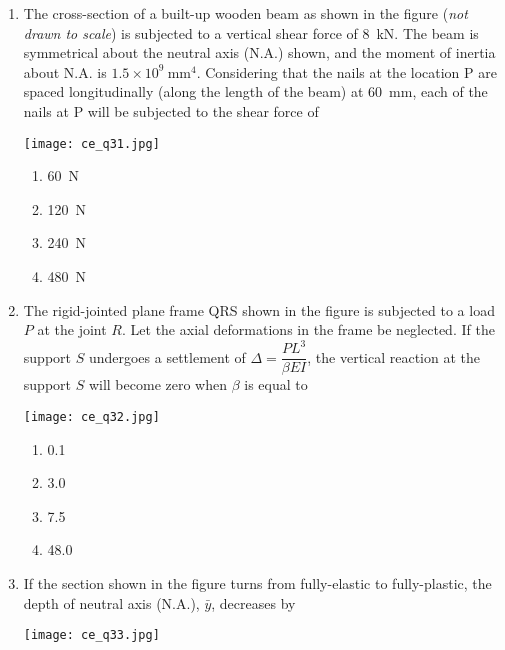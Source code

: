 \documentclass[12pt]{article}
\begin{document}
\begin{enumerate}[label= Q.\arabic*,start =26]
	\item The cross-section of a built-up wooden beam as shown in the figure (\textit{not drawn to scale}) is subjected to a vertical shear force of 8~kN. The beam is symmetrical about the neutral axis (N.A.) shown, and the moment of inertia about N.A. is $1.5 \times 10^9~\mathrm{mm}^4$. Considering that the nails at the location P are spaced longitudinally (along the length of the beam) at 60~mm, each of the nails at P will be subjected to the shear force of
		\begin{center}
			{
				\texttt{[image: ce\_q31.jpg]}
		}\end{center}

		\begin{multicols}{4}
			\begin{enumerate}[label=(\Alph*)]
				\item 60~N
				\item 120~N
				\item 240~N
				\item 480~N
			\end{enumerate}
		\end{multicols}

	\item The rigid-jointed plane frame QRS shown in the figure is subjected to a load $P$ at the joint $R$. Let the axial deformations in the frame be neglected. If the support $S$ undergoes a settlement of $\Delta = \dfrac{PL^3}{\beta EI}$, the vertical reaction at the support $S$ will become zero when $\beta$ is equal to

		\begin{center}
			\texttt{[image: ce\_q32.jpg]}
		\end{center}

		\begin{multicols}{2}
			\begin{enumerate}[label=(\Alph*)]
				\item 0.1
				\item 3.0
				\item 7.5
				\item 48.0
			\end{enumerate}
		\end{multicols}

	\item If the section shown in the figure turns from fully-elastic to fully-plastic, the depth of neutral axis (N.A.), $\bar{y}$, decreases by

		\begin{center}
			\texttt{[image: ce\_q33.jpg]}
		\end{center}


\end{enumerate}
\end{document}
